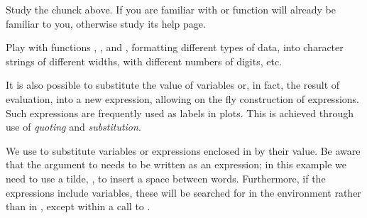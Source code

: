 \documentclass[krantz2]{krantz}\usepackage{knitr}
\begin{document}
\begin{knitrout}\footnotesize
{}\color{fgcolor}
\end{knitrout}

\begin{playground}
Study the chunck above. If you are familiar with  or  function  will already be familiar to you, otherwise study its help page.

Play with functions , , and , formatting different types of data, into character strings of different widths, with different numbers of digits, etc.
\end{playground}

It is also possible to substitute the value of variables or, in fact, the result of evaluation, into a new expression, allowing on the fly construction of expressions. Such expressions are frequently used as labels in plots. This is achieved through use of \emph{quoting} and \emph{substitution}.

We use  to substitute variables or expressions enclosed in  by their value. Be aware that the argument to  needs to be written as an expression; in this example we need to use a tilde, \code{\textasciitilde}, to insert a space between words. Furthermore, if the expressions include variables, these will be searched for in the environment rather than in , except within a call to .
\end{document}
